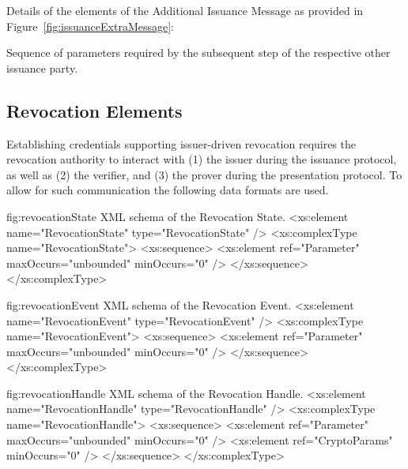 \vspace{3pt}\noindent Details of the elements of the Additional Issuance Message as provided in Figure~\ref{fig:issuanceExtraMessage}:
\begin{parameter}
Sequence of parameters required by the subsequent step of the respective other issuance party. 
\end{parameter}



  






\subsection{Revocation Elements}

Establishing credentials supporting issuer-driven revocation requires the revocation authority to interact with (1) the issuer during the issuance protocol, as well as (2) the verifier, and (3) the prover during the presentation protocol.
To allow for such communication the following data formats are used.

\begin{xml}
{fig:revocationState}
{XML schema of the Revocation State.}
<xs:element name="RevocationState" type="RevocationState" />
<xs:complexType name="RevocationState">
  <xs:sequence>
    <xs:element ref="Parameter" maxOccurs="unbounded"
      minOccurs="0" />
  </xs:sequence>
</xs:complexType>
\end{xml}



\begin{xml}
{fig:revocationEvent}
{XML schema of the Revocation Event.}
<xs:element name="RevocationEvent" type="RevocationEvent" />
<xs:complexType name="RevocationEvent">
  <xs:sequence>
    <xs:element ref="Parameter" maxOccurs="unbounded"
      minOccurs="0" />
  </xs:sequence>
</xs:complexType>
\end{xml}


\begin{xml}
{fig:revocationHandle}
{XML schema of the Revocation Handle.}
<xs:element name="RevocationHandle" type="RevocationHandle" />
<xs:complexType name="RevocationHandle">
  <xs:sequence>
    <xs:element ref="Parameter" maxOccurs="unbounded"
      minOccurs="0" />
    <xs:element ref="CryptoParams" minOccurs="0" />
  </xs:sequence>
</xs:complexType>
\end{xml}


